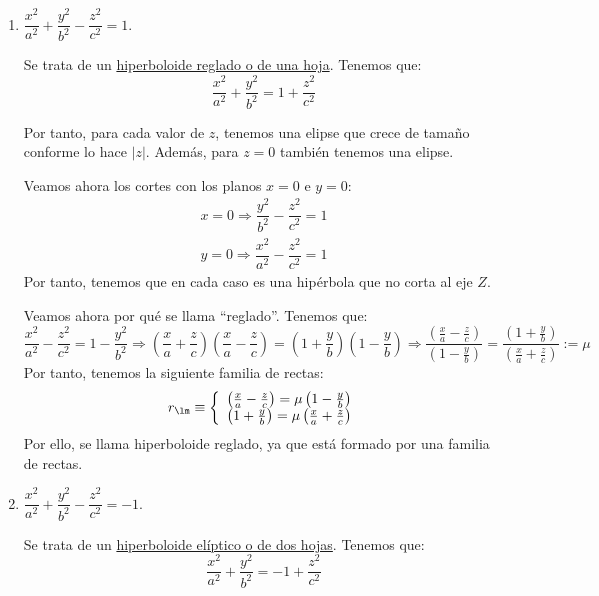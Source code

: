 \begin{enumerate}
    \item $\dfrac{x^2}{a^2} + \dfrac{y^2}{b^2} - \dfrac{z^2}{c^2} = 1$.

    Se trata de un \ul{hiperboloide reglado o de una hoja}. Tenemos que:
    \begin{equation*}
        \dfrac{x^2}{a^2} + \dfrac{y^2}{b^2} = 1 + \dfrac{z^2}{c^2}
    \end{equation*}

    Por tanto, para cada valor de $z$, tenemos una elipse que crece de tamaño conforme lo hace $|z|$. Además, para $z=0$ también tenemos una elipse.

    Veamos ahora los cortes con los planos $x=0$ e $y=0$:
    \begin{gather*}
        x = 0 \Longrightarrow \dfrac{y^2}{b^2} - \dfrac{z^2}{c^2} = 1 \\
        y = 0 \Longrightarrow \dfrac{x^2}{a^2} - \dfrac{z^2}{c^2} = 1
    \end{gather*}
    Por tanto, tenemos que en cada caso es una hipérbola que no corta al eje $Z$.

    Veamos ahora por qué se llama ``reglado''. Tenemos que:
    \begin{equation*}
        \dfrac{x^2}{a^2} - \dfrac{z^2}{c^2} = 1 - \dfrac{y^2}{b^2} \Longrightarrow
        \left(\frac{x}{a}+\frac{z}{c}\right)\left(\frac{x}{a}-\frac{z}{c}\right)=
        \left(1+\frac{y}{b}\right)\left(1-\frac{y}{b}\right)
        \Longrightarrow
        \frac{\left(\frac{x}{a}-\frac{z}{c}\right)}{\left(1-\frac{y}{b}\right)} = \frac{\left(1+\frac{y}{b}\right)}{\left(\frac{x}{a}+\frac{z}{c}\right)}:=\mu
    \end{equation*}
    Por tanto, tenemos la siguiente familia de rectas:
    \begin{equation*}
        r_\lm \equiv \left\{
        \begin{array}{l}
            \left(\frac{x}{a}-\frac{z}{c}\right) = \mu\left(1-\frac{y}{b}\right)\\
            \left(1+\frac{y}{b}\right) = \mu\left(\frac{x}{a}+\frac{z}{c}\right)
        \end{array}
        \right.
    \end{equation*}
    Por ello, se llama hiperboloide reglado, ya que está formado por una familia de rectas.

    
    \item $\dfrac{x^2}{a^2} + \dfrac{y^2}{b^2} - \dfrac{z^2}{c^2} = -1$.

    Se trata de un \ul{hiperboloide elíptico o de dos hojas}. Tenemos que:
    \begin{equation*}
        \dfrac{x^2}{a^2} + \dfrac{y^2}{b^2} = -1 + \dfrac{z^2}{c^2}
    \end{equation*}


\end{enumerate}
